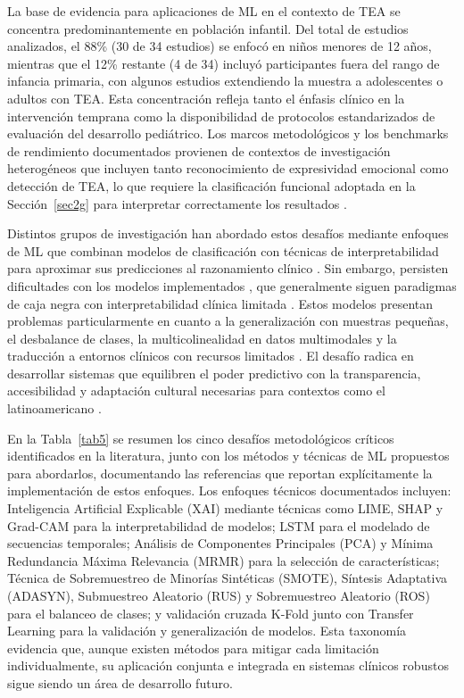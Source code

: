 \documentclass[ASNA,twocolumn]{USG}
\begin{document}
	La base de evidencia para aplicaciones de ML en el contexto de TEA se concentra
	predominantemente en población infantil. Del total de estudios analizados, el 88\%
	(30 de 34 estudios) se enfocó en niños menores de 12 años, mientras que el 12\%
	restante (4 de 34) incluyó participantes fuera del rango de infancia primaria, con
	algunos estudios extendiendo la muestra a adolescentes o adultos con TEA. Esta
	concentración refleja tanto el énfasis clínico en la intervención temprana como la
	disponibilidad de protocolos estandarizados de evaluación del desarrollo pediátrico.
	Los marcos metodológicos y los benchmarks de rendimiento documentados provienen de
	contextos de investigación heterogéneos que incluyen tanto reconocimiento de
	expresividad emocional como detección de TEA, lo que requiere la clasificación
	funcional adoptada en la Sección~\ref{sec2g} para interpretar correctamente los
	resultados \cite{Washington2022}.
	
	Distintos grupos de investigación han abordado estos desafíos mediante enfoques de ML que combinan modelos de clasificación con técnicas de interpretabilidad para aproximar
	sus predicciones al razonamiento clínico \cite{Sariyanidi2025}. Sin embargo,
	persisten dificultades con los modelos implementados \cite{Radocaj2025}, que generalmente
	siguen paradigmas de caja negra con interpretabilidad clínica limitada \cite{Rhatassi2024}.
	Estos modelos presentan problemas particularmente en cuanto a la generalización con muestras
	pequeñas, el desbalance de clases, la multicolinealidad en datos multimodales y la traducción a
	entornos clínicos con recursos limitados \cite{Alam2025}. El desafío radica en
	desarrollar sistemas que equilibren el poder predictivo con la transparencia,
	accesibilidad y adaptación cultural necesarias para contextos como el latinoamericano
	\cite{Shaik2025}.
	
	En la Tabla~\ref{tab5} se resumen los cinco desafíos metodológicos críticos
	identificados en la literatura, junto con los métodos y técnicas de ML propuestos
	para abordarlos, documentando las referencias que reportan explícitamente la
	implementación de estos enfoques. Los enfoques técnicos documentados incluyen:
	Inteligencia Artificial Explicable (XAI) mediante técnicas como LIME, SHAP y
	Grad-CAM para la interpretabilidad de modelos; LSTM para el modelado de secuencias
	temporales; Análisis de Componentes Principales (PCA) y Mínima Redundancia Máxima
	Relevancia (MRMR) para la selección de características; Técnica de Sobremuestreo de
	Minorías Sintéticas (SMOTE), Síntesis Adaptativa (ADASYN), Submuestreo Aleatorio
	(RUS) y Sobremuestreo Aleatorio (ROS) para el balanceo de clases; y validación
	cruzada K-Fold junto con Transfer Learning para la validación y generalización de
	modelos. Esta taxonomía evidencia que, aunque existen métodos para mitigar cada
	limitación individualmente, su aplicación conjunta e integrada en sistemas clínicos
	robustos sigue siendo un área de desarrollo futuro.
	
\end{document}
